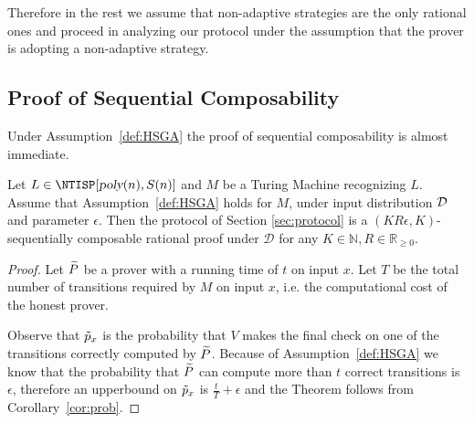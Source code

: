 Therefore in the rest we assume that non-adaptive strategies are the only rational ones and proceed in analyzing our protocol 
under the assumption that the prover is adopting a non-adaptive strategy. 


\subsection{Proof of Sequential Composability}

Under Assumption~\ref{def:HSGA} the proof of sequential composability is almost 
immediate. 

\begin{theorem}
Let $L \in \NTISP[\poly(n), S(n)]$ and $M$ be a Turing Machine recognizing $L$. Assume that  Assumption~\ref{def:HSGA} holds for $M$, under input distribution 
$\cal D$ and parameter $\epsilon$. Then the protocol of Section  \ref{sec:protocol} is a $(KR\epsilon, K)$-sequentially composable rational proof under $\mathcal{D}$ for any $K \in \mathbb{N}, R \in \mathbb{R}_{\geq 0}$.  
\end{theorem}
\begin{proof}
Let $\widetilde{P}$ be a prover with a running time of $t$ on input $x$.
Let $T$ be the total number of transitions required by $M$ on input $x$, i.e. the 
computational cost of the honest prover.

Observe that $\tilde{p}_x$ is the probability that $V$ makes the final check on one of the transitions correctly computed by $\widetilde{P}$. 
Because of Assumption~\ref{def:HSGA} we know that the probability that $\widetilde{P}$ can 
compute more than $t$ correct transitions is $\epsilon$, therefore an upperbound on 
$\tilde{p}_x$ is $\frac{t}{T}+\epsilon$ and the Theorem follows from Corollary~\ref{cor:prob}. 
\end{proof}